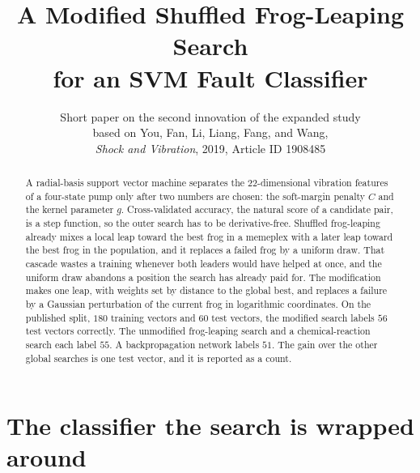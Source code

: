 \documentclass[11pt,a4paper]{article}
\title{\textbf{A Modified Shuffled Frog-Leaping Search\\ for an SVM Fault Classifier}}
\author{Short paper on the second innovation of the expanded study\\
based on You, Fan, Li, Liang, Fang, and Wang,\\
\textit{Shock and Vibration}, 2019, Article ID 1908485}
\date{}
\begin{document}
\maketitle
\thispagestyle{empty}
\vspace{-1.6em}

\begin{abstract}
\noindent
A radial-basis support vector machine separates the $22$-dimensional vibration features of a four-state pump only after two numbers are chosen: the soft-margin penalty $C$ and the kernel parameter $g$.
Cross-validated accuracy, the natural score of a candidate pair, is a step function, so the outer search has to be derivative-free.
Shuffled frog-leaping already mixes a local leap toward the best frog in a memeplex with a later leap toward the best frog in the population, and it replaces a failed frog by a uniform draw.
That cascade wastes a training whenever both leaders would have helped at once, and the uniform draw abandons a position the search has already paid for.
The modification makes one leap, with weights set by distance to the global best, and replaces a failure by a Gaussian perturbation of the current frog in logarithmic coordinates.
On the published split, $180$ training vectors and $60$ test vectors, the modified search labels $56$ test vectors correctly.
The unmodified frog-leaping search and a chemical-reaction search each label $55$.
A backpropagation network labels $51$.
The gain over the other global searches is one test vector, and it is reported as a count.
\end{abstract}

\section{The classifier the search is wrapped around}
\end{document}

